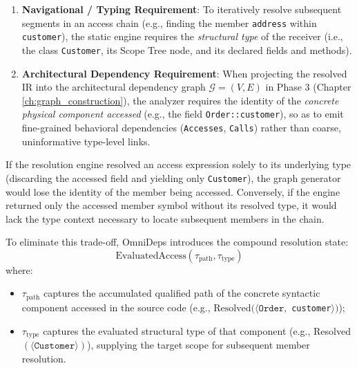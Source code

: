 \begin{enumerate}
  \item \textbf{Navigational / Typing Requirement}: To iteratively
    resolve subsequent
    segments in an access chain (e.g., finding the member
      \texttt{address} within
    \texttt{customer}), the static engine requires the
    \textit{structural type} of
    the receiver (i.e., the class \texttt{Customer}, its Scope Tree
      node, and its
    declared fields and methods).
  \item \textbf{Architectural Dependency Requirement}: When
    projecting the resolved
    IR into the architectural dependency graph $\mathcal{G} = (V, E)$ in Phase 3
    (Chapter \ref{ch:graph_construction}), the analyzer requires the
    identity of the
    \textit{concrete physical component accessed} (e.g., the field
    \texttt{Order::customer}),
    so as to emit fine-grained behavioral dependencies
    (\texttt{Accesses}, \texttt{Calls})
    rather than coarse, uninformative type-level links.
\end{enumerate}

If the resolution engine resolved an access expression solely to its
underlying type
(discarding the accessed field and yielding only \texttt{Customer}),
the graph generator
would lose the identity of the member being accessed. Conversely, if
the engine returned
only the accessed member symbol without its resolved type, it would
lack the type context
necessary to locate subsequent members in the chain.

To eliminate this trade-off, OmniDeps introduces the compound resolution state:
$$\text{EvaluatedAccess}(\tau_{\text{path}}, \tau_{\text{type}})$$
where:
\begin{itemize}
  \item $\tau_{\text{path}}$ captures the accumulated qualified path
    of the concrete
    syntactic component accessed in the source code (e.g.,
      $\text{Resolved}(\langle \texttt{Order},$
    \texttt{cus}\-\texttt{tom}\-\texttt{er}$\rangle)$);
  \item $\tau_{\text{type}}$ captures the evaluated structural type
    of that component
    (e.g., Re\-solved$(\langle \texttt{Customer} \rangle)$), supplying the
    target scope for subsequent member resolution.
\end{itemize}

